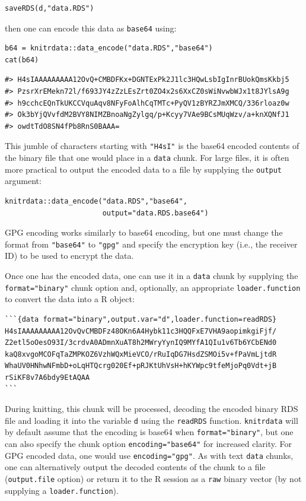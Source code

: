 \begin{verbatim}
saveRDS(d,"data.RDS")
\end{verbatim}

then one can encode this data as \texttt{base64} using:

\begin{verbatim}
b64 = knitrdata::data_encode("data.RDS","base64")
cat(b64)
\end{verbatim}

\begin{verbatim}
#> H4sIAAAAAAAAA12OvQ+CMBDFKx+DGNTExPk2J1lc3HQwLsbIgInrBUokQmsKkbj5
#> PzsrXrEMekn72l/f693JY4zZzLEsZrt0ZO4x2s6XxCZ0sWiNvwbWJx1t8JYlsA9g
#> h9cchcEQnTkUKCCVquAqv8NFyFoAlhCqTMTc+PyQV1zBYRZJmXMCQ/336rloaz0w
#> Ok3bYjQVvfdM2BVY8NIMZBnoaNgZylgq/p+Kcyy7VAe9BCsMUqWzv/a+knXQNfJ1
#> owdtTdO8SN4fPb8RnS0BAAA=
\end{verbatim}

This jumble of characters starting with \texttt{"H4sI"} is the base64 encoded contents of the binary file that one would place in a \texttt{data} chunk. For large files, it is often more practical to output the encoded data to a file by supplying the \texttt{output} argument:

\begin{verbatim}
knitrdata::data_encode("data.RDS","base64",
                       output="data.RDS.base64")
\end{verbatim}

GPG encoding works similarly to base64 encoding, but one must change the format from \texttt{"base64"} to \texttt{"gpg"} and specify the encryption key (i.e., the receiver ID) to be used to encrypt the data.

Once one has the encoded data, one can use it in a \texttt{data} chunk by supplying the \texttt{format="binary"} chunk option and, optionally, an appropriate \texttt{loader.function} to convert the data into a R object:

\begin{verbatim}
```{data format="binary",output.var="d",loader.function=readRDS}
H4sIAAAAAAAAA12OvQvCMBDFz48OKn6A4Hybk11c3HQQFxE7VHA9aopimkgiFjf/
Z2etl5oOesO93I/3crdvA0ADmnXuAT8h2MWryYynIQ9MYfA1QIu1v6Tb6YCbENd0
kaQ8xvgoMCOFqTaZMPKOZ6VzhWQxMieVCO/rRuIqDG7HsdZSMOi5v+fPaVmLjtdR
WhaUV0HNhwNFmbD+oLqHTQcrg020Ef+pRJKtUhVsH+hKYWpc9tfeMjoPq0Vdt+jB
rSiKF8v7A6bdy9EtAQAA
```
\end{verbatim}

During knitting, this chunk will be processed, decoding the encoded binary RDS file and loading it into the variable \texttt{d} using the \texttt{readRDS} function. \texttt{knitrdata} will by default assume that the encoding is base64 when \texttt{format="binary"}, but one can also specify the chunk option \texttt{encoding="base64"} for increased clarity. For GPG encoded data, one would use \texttt{encoding="gpg"}. As with text \texttt{data} chunks, one can alternatively output the decoded contents of the chunk to a file (\texttt{output.file} option) or return it to the R session as a \texttt{raw} binary vector (by not supplying a \texttt{loader.function}).

